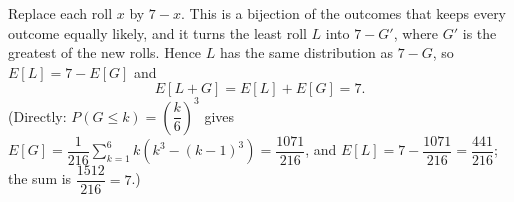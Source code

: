 Replace each roll $x$ by $7-x$. This is a bijection of the outcomes that keeps every outcome equally likely, and it turns the least roll $L$ into $7-G'$, where $G'$ is the greatest of the new rolls. Hence $L$ has the same distribution as $7-G$, so $E[L]=7-E[G]$ and
\[
E[L+G]=E[L]+E[G]=\boxed{7}.
\]
(Directly: $P(G\le k)=\left(\dfrac {k}{6}\right)^3$ gives $E[G]=\dfrac{1}{216}\sum_{k=1}^{6}k\left(k^3-(k-1)^3\right)=\dfrac{1071}{216}$, and $E[L]=7-\dfrac{1071}{216}=\dfrac{441}{216}$; the sum is $\dfrac{1512}{216}=7$.)

